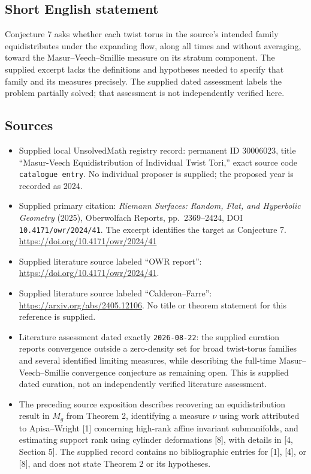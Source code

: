 \documentclass[11pt]{article}
\begin{document}
\subsection{Short English statement}
Conjecture 7 asks whether each twist torus in the source's intended family equidistributes under the expanding flow, along all times and without averaging, toward the Masur--Veech--Smillie measure on its stratum component. The supplied excerpt lacks the definitions and hypotheses needed to specify that family and its measures precisely. The supplied dated assessment labels the problem partially solved; that assessment is not independently verified here.
\subsection{Sources}
\begin{itemize}
\item Supplied local UnsolvedMath registry record: permanent ID \(30006023\), title ``Masur-Veech Equidistribution of Individual Twist Tori,'' exact source code \texttt{catalogue entry}. No individual proposer is supplied; the proposed year is recorded as 2024.
\item Supplied primary citation: \emph{Riemann Surfaces: Random, Flat, and Hyperbolic Geometry} (2025), Oberwolfach Reports, pp.\ 2369--2424, DOI \texttt{10.4171/owr/2024/41}. The excerpt identifies the target as Conjecture 7. \url{https://doi.org/10.4171/owr/2024/41}
\item Supplied literature source labeled ``OWR report'': \url{https://doi.org/10.4171/owr/2024/41}.
\item Supplied literature source labeled ``Calderon--Farre'': \url{https://arxiv.org/abs/2405.12106}. No title or theorem statement for this reference is supplied.
\item Literature assessment dated exactly \texttt{2026-08-22}: the supplied curation reports convergence outside a zero-density set for broad twist-torus families and several identified limiting measures, while describing the full-time Masur--Veech--Smillie convergence conjecture as remaining open. This is supplied dated curation, not an independently verified literature assessment.
\item The preceding source exposition describes recovering an equidistribution result in \(M_g\) from Theorem 2, identifying a measure \(\nu\) using work attributed to Apisa--Wright [1] concerning high-rank affine invariant submanifolds, and estimating support rank using cylinder deformations [8], with details in [4, Section 5]. The supplied record contains no bibliographic entries for [1], [4], or [8], and does not state Theorem 2 or its hypotheses.
\end{itemize}
\end{document}

